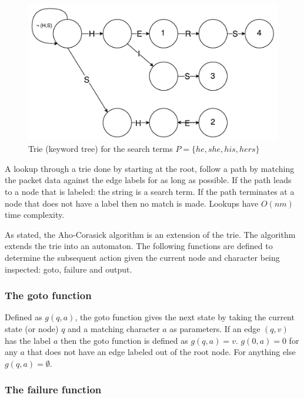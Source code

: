 \documentclass{article}
\begin{document}
\begin{figure}[hbt]
  \label{trie}
  \centering
  \makeatletter
  \includegraphics[width=\textwidth]{images/trie.pdf}
  \caption{Trie (keyword tree) for the search terms \(P = \{he, she, his, hers\}\)}
\end{figure}

A lookup through a trie done by starting at the root, follow a path by matching the packet data against the edge labels for as long as possible. If the path leads to a node that is labeled: the string is a search term. If the path terminates at a node that does not have a label then no match is made. Lookups have \(O(nm)\) time complexity.

As stated, the Aho-Corasick algorithm is an extension of the trie. The algorithm extends the trie into an automaton. The following functions are defined to determine the subsequent action given the current node and character being inspected: goto, failure and output.

\subsubsection{The goto function} \label{goto-function}

Defined as \(g(q, a)\), the goto function gives the next state by taking the current state (or node) \(q\) and a matching character \(a\) as parameters. If an edge \((q, v)\) has the label \(a\) then the goto function is defined as \(g(q, a) = v\). \(g(0, a) = 0\) for any \(a\) that does not have an edge labeled out of the root node. For anything else \(g(q, a) =  \emptyset\).

\subsubsection{The failure function} \label{failure-function}
\end{document}
